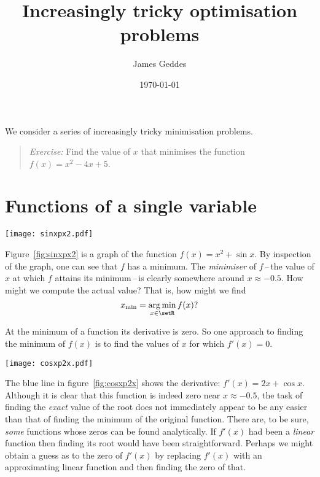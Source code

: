\documentclass[10pt, a4paper]{article}
\title{Increasingly tricky optimisation problems}
\author{James Geddes}
\date{\today}
\DeclareMathOperator*{\argmin}{arg\,min}
\begin{document}
\maketitle

We consider a series of increasingly tricky minimisation
problems.
\begin{quote}
  \emph{Exercise:} Find the value of $x$ that minimises the function
  $f(x) = x^2 - 4x + 5$.
\end{quote}

\section{Functions of a single variable}\label{sec:univariate}
\begin{marginfigure}
  \centering
  \texttt{[image: sinxpx2.pdf]}
  \label{fig:sinxpx2}
\end{marginfigure}

Figure~\ref{fig:sinxpx2} is a graph of the function
$f(x) = x^2+\sin x$. By inspection of the graph, one can see that $f$
has a minimum. The \emph{minimiser} of $f$\,--\,the value of $x$ at
which $f$ attains its minimum\,--\,is clearly somewhere around
$x \approx -0.5$. How might we compute the actual value? That is, how might
we find
\begin{equation*}
  x_\text{min} = \argmin_{x\in\setR} f(x)?
\end{equation*}

At the minimum of a function its derivative is zero. So one approach
to finding the minimum of $f(x)$ is to find the values of $x$ for
which $f'(x)=0$.

\begin{marginfigure}
  \centering \texttt{[image: cosxp2x.pdf]} 
  \label{fig:cosxp2x}
\end{marginfigure}

The blue line in figure~\ref{fig:cosxp2x} shows the derivative:
$f'(x) = 2x+\cos x$. Although it is clear that this function is indeed
zero near $x\approx-0.5$, the task of finding the \emph{exact} value of the
root does not immediately appear to be any easier than that of finding
the minimum of the original function. There are, to be sure,
\emph{some} functions whose zeros can be found analytically. If
$f'(x)$ had been a \emph{linear} function then finding its root would
have been straightforward. Perhaps we might obtain a guess as to the
zero of $f'(x)$ by replacing $f'(x)$ with an approximating linear
function and then finding the zero of that.
\end{document}
